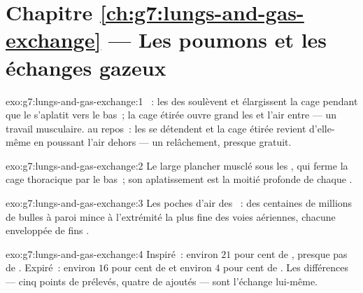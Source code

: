 \section*{Chapitre \ref{ch:g7:lungs-and-gas-exchange} --- Les poumons et les échanges gazeux}

\begin{solution}{exo:g7:lungs-and-gas-exchange:1}
~: les  des  soulèvent et élargissent la cage
pendant que le  s'aplatit vers le bas~; la cage étirée
ouvre grand les  et l'air entre --- un travail musculaire.
 au repos~: les  se détendent et la cage étirée
revient d'elle-même en poussant l'air dehors --- un relâchement,
presque gratuit.
\end{solution}

\begin{solution}{exo:g7:lungs-and-gas-exchange:2}
Le large plancher musclé sous les , qui ferme la cage
thoracique par le bas~; son aplatissement est la moitié profonde de
chaque .
\end{solution}

\begin{solution}{exo:g7:lungs-and-gas-exchange:3}
Les poches d'air des ~: des centaines de millions de bulles à
paroi mince à l'extrémité la plus fine des voies aériennes, chacune
enveloppée de fins .
\end{solution}

\begin{solution}{exo:g7:lungs-and-gas-exchange:4}
Inspiré~: environ $21$ pour cent de , presque pas de
. Expiré~: environ $16$ pour cent de  et
environ $4$ pour cent de . Les différences ---
cinq points de  prélevés, quatre de 
ajoutés --- sont l'échange lui-même.
\end{solution}

